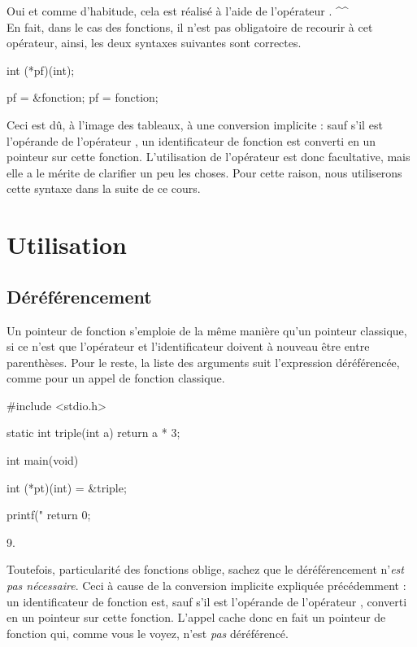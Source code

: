 Oui et comme d'habitude, cela est réalisé à l'aide de l'opérateur
\mybox{\&}. \^{}\^{}\\
En fait, dans le cas des fonctions, il n'est pas obligatoire de recourir
à cet opérateur, ainsi, les deux syntaxes suivantes sont correctes.

\begin{C}
int (*pf)(int);

pf = &fonction;
pf = fonction;
\end{C}

Ceci est dû, à l'image des tableaux, à une conversion implicite : sauf
s'il est l'opérande de l'opérateur \mybox{\&}, un identificateur de
fonction est converti en un pointeur sur cette fonction. L'utilisation
de l'opérateur \mybox{\&} est donc facultative, mais elle a le mérite
de clarifier un peu les choses. Pour cette raison, nous utiliserons
cette syntaxe dans la suite de ce cours.

\section{Utilisation}
\label{utilisation-6}


\subsection{Déréférencement}
\label{dereferencement-1}

Un pointeur de fonction s'emploie de la même manière qu'un pointeur
classique, si ce n'est que l'opérateur \mybox{*} et l'identificateur
doivent à nouveau être entre parenthèses. Pour le reste, la liste des
arguments suit l'expression déréférencée, comme pour un appel de
fonction classique.

\begin{C}
#include <stdio.h>


static int triple(int a)
{
    return a * 3;
}


int main(void)
{
    int (*pt)(int) = &triple;

    printf("%
    return 0;
}
\end{C}

\begin{C}
9.
\end{C}

Toutefois, particularité des fonctions oblige, sachez que le
déréférencement n'\emph{est pas nécessaire}. Ceci à cause de la
conversion implicite expliquée précédemment : un identificateur de
fonction est, sauf s'il est l'opérande de l'opérateur \mybox{\&},
converti en un pointeur sur cette fonction. L'appel 
cache donc en fait un pointeur de fonction qui, comme vous le voyez,
n'est \emph{pas} déréférencé.

